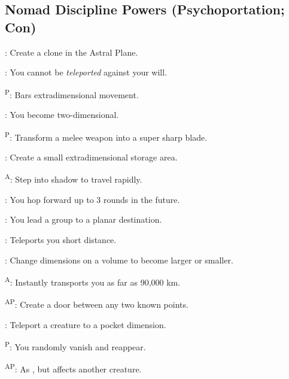 \subsection{Nomad Discipline Powers {\normalsize(Psychoportation; Con)}}
\begin{enumerate*}
\item {}: Create a clone in the Astral Plane.

      : You cannot be \emph{teleported} against your will.

\item {}\textsuperscript{P}: Bars extradimensional movement.

      : You become two-dimensional.

\item {}\textsuperscript{P}: Transform a melee weapon into a super sharp blade.

      : Create a small extradimensional storage area.

      \textsuperscript{A}: Step into shadow to travel rapidly.

      : You hop forward up to 3 rounds in the future.

\item {}: You lead a group to a planar destination.

      : Teleports you short distance. %

      : Change dimensions on a volume to become larger or smaller.

\item {}\textsuperscript{A}: Instantly transports you as far as 90,000 km.

      \textsuperscript{AP}: Create a door between any two known points.

\item {}: Teleport a creature to a pocket dimension.

      \textsuperscript{P}: You randomly vanish and reappear.

      \textsuperscript{AP}: As , but affects another creature.


\end{enumerate*}
